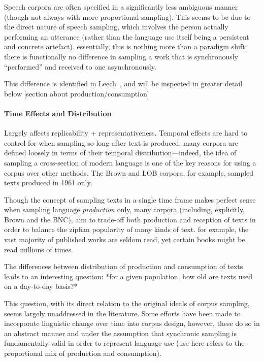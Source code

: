 
Speech corpora are often specified in a significantly less ambiguous manner (though not always with more proportional sampling). This seems to be due to the direct nature of speech sampling, which involves the person actually performing an utterance (rather than the language use itself being a persistent and concrete artefact).  essentially, this is nothing more than a paradigm shift: there is functionally no difference in sampling a work that is synchronously ``performed'' and received to one asynchronously.

This difference is identified in Leech~\cite{leech2006new}, and will be inspected in greater detail below [section about production/consumption]









\paragraph{ Time Effects and Distribution }
Largely affects replicability + representativeness. Temporal effects are hard to control for when sampling so long after text is produced. 
many corpora are defined loosely in terms of their temporal distribution---indeed, the idea of sampling a cross-section of modern language is one of the key reasons for using a corpus over other methods. The Brown and LOB corpora, for example, sampled texts produced in 1961 only.

Though the concept of sampling texts in a single time frame makes perfect sense when sampling language \textit{production} only, many corpora (including, explicitly, Brown and the BNC), aim to trade-off both production and reception of texts in order to balance the zipfian popularity of many kinds of text.  for example, the vast majority of published works are seldom read, yet certain books might be read millions of times.

The differences between distribution of production and consumption of texts leads to an interesting question: *for a given population, how old are texts used on a day-to-day basis?*

This question, with its direct relation to the original ideals of corpus sampling, seems largely unaddressed in the literature. Some efforts have been made to incorporate linguistic change over time into corpus design, however, these do so in an abstract manner and under the assumption that synchronic sampling is fundamentally valid in order to represent language use (use here refers to the proportional mix of production and consumption).

